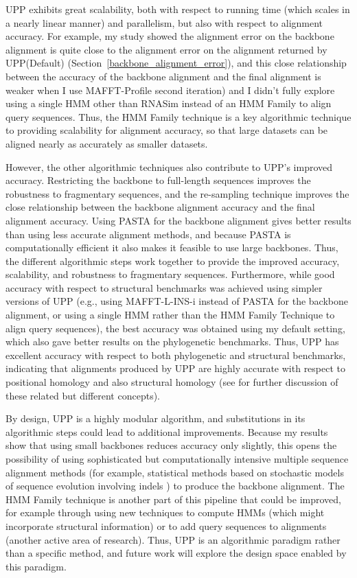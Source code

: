 UPP exhibits great scalability, both with respect to
running time (which scales in a nearly linear manner)
and parallelism, but also with respect to alignment accuracy.
For example, my study showed the alignment error on the backbone alignment is quite close to the alignment error on the alignment
returned by UPP(Default) (Section~\ref{backbone_alignment_error}), 
and this close relationship between the accuracy of the backbone alignment
and the final alignment is weaker when I use MAFFT-Profile
second iteration) and I didn't fully explore using a single HMM other than RNASim
instead of an HMM Family to align query sequences. 
Thus, the HMM Family technique is a key algorithmic 
technique to providing scalability for alignment accuracy, so that
large datasets can be aligned nearly as accurately as smaller datasets.  

However, the other algorithmic techniques also contribute to 
UPP's improved accuracy.
Restricting the backbone to full-length sequences improves
the robustness to fragmentary sequences, and
the re-sampling technique improves the close relationship between the
backbone alignment accuracy and the final alignment accuracy.
Using PASTA for the backbone alignment gives better results
than using less accurate alignment methods, 
and because PASTA is computationally efficient it also
makes it feasible to use large backbones.
Thus, the different algorithmic steps work together to
provide the improved accuracy, scalability, and robustness
to fragmentary sequences.
Furthermore, while good accuracy with respect to
structural benchmarks
was achieved using simpler versions of UPP (e.g.,
using MAFFT-L-INS-i instead of PASTA for the backbone alignment,
or using a single HMM rather than the HMM Family Technique to
align query sequences), 
the best accuracy was
obtained using my default setting, 
which also gave better results on the phylogenetic benchmarks.
Thus, UPP has excellent accuracy with respect to 
both phylogenetic and structural benchmarks, indicating
that alignments produced by UPP are highly accurate 
with respect to  positional homology and also structural homology (see
\cite{Reeck1987} for further discussion of these 
related but different concepts).

By design,
UPP is a highly modular algorithm, 
and substitutions in its algorithmic steps could lead to additional
improvements.  Because my results show that  
using small backbones
reduces accuracy only slightly, this opens the possibility of 
using sophisticated but computationally intensive
multiple sequence
alignment methods (for example, 
statistical methods based on stochastic models of sequence evolution involving
indels \cite{rs06,jordan-pnas2013}) 
to produce the backbone alignment.
The HMM Family technique is another part of
this pipeline that could be improved, for example
through using new techniques to compute HMMs (which might incorporate
structural information) or to add query 
sequences to alignments (another active area of research).  
Thus, UPP is an algorithmic paradigm rather than a specific
method, and future work will explore the design space enabled by
this paradigm.

